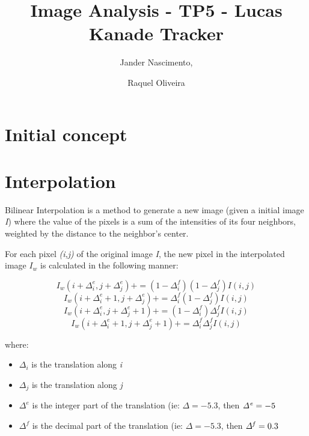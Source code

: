 \documentclass{article}
\begin{document}
\title{Image Analysis - TP5 - Lucas Kanade Tracker}

\author{Jander Nascimento, 
\and Raquel Oliveira}

\maketitle

\section{Initial concept}


\section{Interpolation}

	Bilinear Interpolation is a method to generate a new image (given a initial image {\it I}) where the value of the pixels is a sum of the intensities of its four neighbors, weighted by the distance to the neighbor's center.

	For each pixel {\it(i,j)} of the original image {\it I}, the new pixel in the interpolated image {\it $I_w$} is calculated in the following manner:

	\begin{equation}
		I_w(i+\Delta_i^e , j+\Delta_j^e) += (1-\Delta_i^f)(1-\Delta_j^f)I(i,j)
	\end{equation}
	\begin{equation}
		I_w(i+\Delta_i^e+1 , j+\Delta_j^e) += \Delta_i^f(1-\Delta_j^f)I(i,j)
	\end{equation}
	\begin{equation}
  		I_w(i+\Delta_i^e , j+\Delta_j^e+1) += (1-\Delta_i^f)\Delta_j^fI(i,j)
	\end{equation}
	\begin{equation}
		I_w(i+\Delta_i^e+1 , j+\Delta_j^e+1) += \Delta_i^f \Delta_j^fI(i,j)
	\end{equation}

	where: 
		\begin{itemize}
			\item {\it $\Delta_i$} is the translation along {\it i}
			\item {\it $\Delta_j$} is the translation along {\it j} 
			\item {\it $\Delta^e$} is the integer part of the translation (ie: $\Delta=-5.3$, then ${\it \Delta^e}=-5$
			\item {\it $\Delta^f$} is the decimal part of the translation (ie: $\Delta=-5.3$, then ${\it \Delta^f}=0.3$
		\end{itemize}
\end{document}
